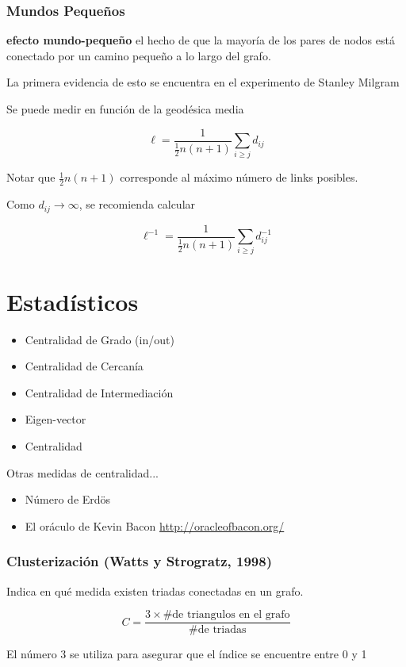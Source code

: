 \documentclass{beamer}
\begin{document}
\begin{frame}
\frametitle{Mundos Peque\~nos}

{\bf efecto mundo-peque\~no} el hecho de que la mayor\'ia de los pares de
nodos est\'a conectado por un camino peque\~no a lo largo del grafo.

La primera evidencia de esto se encuentra en el experimento de Stanley Milgram
\cite{milgram1967} 

Se puede medir en funci\'on de la geod\'esica media

\begin{equation}
\ell = \frac{1}{\frac{1}{2}n(n+1)}\sum_{i\geq j}{d_{ij}}
\end{equation}

Notar que $\frac{1}{2}n(n+1)$ corresponde al m\'aximo n\'umero de links
posibles.

Como $d_{ij} \rightarrow \infty$, se recomienda calcular

\begin{equation}
\ell^{-1} = \frac{1}{\frac{1}{2}n(n+1)}\sum_{i\geq j}{d_{ij}^{-1}}
\end{equation}

\end{frame}

\section{Estad\'isticos}

\begin{frame}
\begin{itemize}
\item Centralidad de Grado (in/out)
\item Centralidad de Cercan\'ia
\item Centralidad de Intermediaci\'on
\item Eigen-vector
\item Centralidad
\end{itemize}

Otras medidas de centralidad...
\begin{itemize}
\item N\'umero de Erd{\"o}s 
\item El or\'aculo de Kevin Bacon \url{http://oracleofbacon.org/}
\end{itemize}
\end{frame}

\begin{frame}
\frametitle{Clusterizaci\'on (Watts y Strogratz, 1998)}

Indica en qu\'e medida existen triadas conectadas en un grafo.

\begin{equation}
C = \frac{3 \times \text{\# de triangulos en el grafo}}{\text{\# de triadas}}
\end{equation}

El n\'umero 3 se utiliza para asegurar que el \'indice se encuentre entre 0 y 1

\end{frame}
\end{document}
